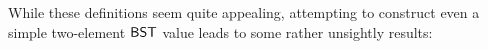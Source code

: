 \documentclass[sigplan]{acmart}%
\begin{document}
\begin{code}
\>[2]\AgdaSpace{}%
\AgdaSpace{}%
\AgdaSymbol{(}\AgdaSpace{}%
\AgdaSpace{}%
\AgdaSymbol{:}\AgdaSpace{}%
\AgdaSymbol{)}\AgdaSpace{}%
\AgdaSymbol{:}\AgdaSpace{}%
\AgdaSpace{}%
\<%
\\
\>[2][@{}l@{\AgdaIndent{0}}]%
\>[4]\AgdaSpace{}%
\AgdaSymbol{:}\AgdaSpace{}%
\AgdaSymbol{(}\AgdaSpace{}%
\AgdaSpace{}%
\AgdaSymbol{)}\AgdaSpace{}%
\AgdaSpace{}%
\AgdaSpace{}%
\AgdaSpace{}%
\<%
\\
%
\>[4]%
\>[12]\AgdaSymbol{:}\AgdaSpace{}%
\AgdaSymbol{(}\AgdaSpace{}%
\AgdaSymbol{:}\AgdaSpace{}%
\AgdaSymbol{)}\AgdaSpace{}%
\AgdaSpace{}%
\AgdaSpace{}%
\AgdaSpace{}%
\AgdaSpace{}%
\AgdaSpace{}%
\AgdaSpace{}%
\AgdaSpace{}%
\AgdaSpace{}%
\AgdaSpace{}%
\AgdaSpace{}%
\AgdaSpace{}%
\<%
%
\end{code}
While these definitions seem quite appealing, attempting to 
construct even a simple two-element $\AgdaDatatype{BST}$ 
value leads to some rather unsightly results:
\begin{code}
\>[2]\AgdaSpace{}%
\AgdaSymbol{:}\AgdaSpace{}%
\AgdaSpace{}%
\AgdaSpace{}%
\<%
\\
%
\>[2]\AgdaSpace{}%
\AgdaSymbol{=}%
\>[847I]\AgdaSpace{}%
\<%
\\
\>[847I][@{}l@{\AgdaIndent{0}}]%
\>[10]\AgdaSymbol{(}\AgdaSpace{}%
\<%
\\
\>[10][@{}l@{\AgdaIndent{0}}]%
\>[13]\AgdaSymbol{(}\AgdaSpace{}%
\AgdaSymbol{(}\AgdaSpace{}%
\AgdaSymbol{(}\AgdaSpace{}%
\AgdaSymbol{)))}\<%
\\
%
\>[13]\AgdaSymbol{(}\AgdaSpace{}%
\AgdaSymbol{(}\AgdaSpace{}%
\AgdaSymbol{(}\AgdaSpace{}%
\AgdaSymbol{))))}\<%
\\
%
\>[10]\AgdaSymbol{(}\AgdaSpace{}%
\AgdaSymbol{(}\AgdaSpace{}%
\AgdaSymbol{(}\AgdaSpace{}%
\AgdaSymbol{(}\AgdaSpace{}%
\AgdaSymbol{))))}\<%
\end{code}
\end{document}
